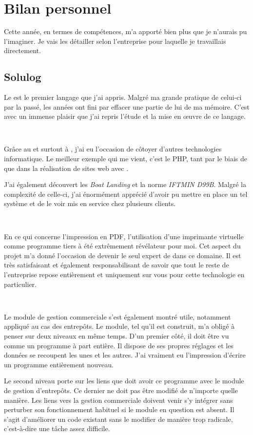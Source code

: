 \chapter{Bilan personnel}
Cette année, en termes de compétences, m'a apporté bien plus que je n'aurais pu l'imaginer. Je vais les détailler selon l'entreprise pour laquelle je travaillais directement.

\section{Solulog}
Le \vb{} est le premier langage que j'ai appris. Malgré ma grande pratique de celui-ci par la passé, les années ont fini par effacer une partie de lui de ma mémoire. C'est avec un immense plaisir que j'ai repris l'étude et la mise en œuvre de ce langage.

~

Grâce au \vb{} et surtout à \integrale, j'ai eu l'occasion de côtoyer d'autres technologies informatique. Le meilleur exemple qui me vient, c'est le PHP, tant par le biais de \pireus{} que dans la réalisation de sites web avec \fidit.

J'ai également découvert les \emph{Boat Landing} et la norme \emph{IFTMIN D99B}. Malgré la complexité de celle-ci, j'ai énormément apprécié d'avoir pu mettre en place un tel système et de le voir mis en service chez plusieurs clients.

~

En ce qui concerne l'impression en PDF, l'utilisation d'une imprimante virtuelle comme programme tiers à été extrêmement révélateur pour moi. Cet aspect du projet m'a donné l'occasion de devenir le seul expert de \solulog{} dans ce domaine. Il est très satisfaisant et également responsabilisant de savoir que tout le reste de l'entreprise repose entièrement et uniquement sur vous pour cette technologie en particulier.

~

Le module de gestion commerciale s'est également montré utile, notamment appliqué au cas des entrepôts. Le module, tel qu'il est construit, m'a obligé à penser sur deux niveaux en même temps. D'un premier côté, il doit être vu comme un programme à part entière. Il dispose de ses propres réglages et les données se recoupent les unes et les autres. J'ai vraiment eu l'impression d'écrire un programme entièrement nouveau.

Le second niveau porte sur les liens que doit avoir ce programme avec le module de gestion d'entrepôts. Ce dernier ne doit pas être modifié de n'importe quelle manière. Les liens vers la gestion commerciale doivent venir s'y intégrer sans perturber son fonctionnement habituel si le module en question est absent. Il s'agit d'améliorer un code existant sans le modifier de manière trop radicale, c'est-à-dire une tâche assez difficile.

